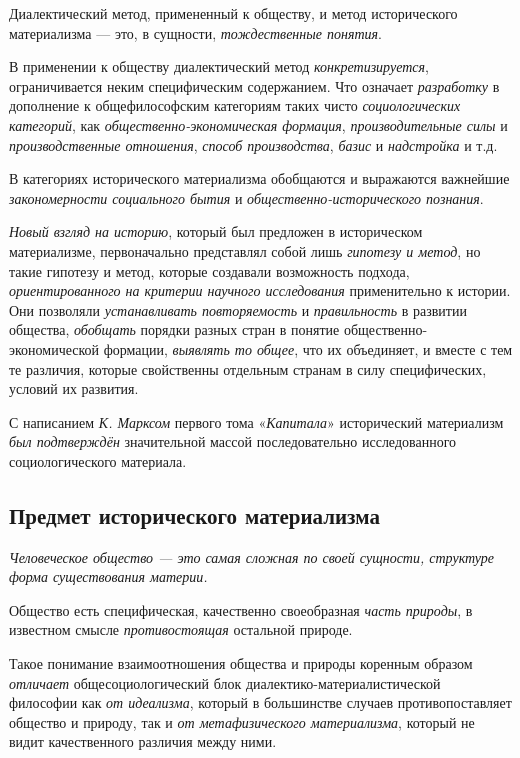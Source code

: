 \documentclass[a4paper,14pt,russian]{extreport}
\begin{document}
Диалектический метод, примененный к обществу, и метод исторического материализма --- это, в сущности, \emph{тождественные понятия}.

В применении к обществу диалектический метод \emph{конкретизируется}, ограничивается неким специфическим содержанием. Что означает \emph{разработку} в дополнение к общефилософским категориям таких чисто \emph{социологических категорий}, как \emph{общественно-экономическая формация}, \emph{производительные силы} и \emph{производственные отношения}, \emph{способ производства}, \emph{базис} и \emph{надстройка} и т.д.

В категориях исторического материализма обобщаются и выражаются важнейшие \emph{закономерности социального бытия} и \emph{общественно-исторического познания}.

\emph{Новый взгляд на историю}, который был предложен в историческом материализме, первоначально представлял собой лишь \emph{гипотезу и метод}, но такие гипотезу и метод, которые создавали возможность подхода, \emph{ориентированного на критерии научного исследования} применительно к истории. Они позволяли \emph{устанавливать повторяемость} и \emph{правильность} в развитии общества, \emph{обобщать} порядки разных стран в понятие общественно-экономической формации, \emph{выявлять то общее}, что их объединяет, и вместе с тем те различия, которые свойственны отдельным странам в силу специфических, условий их развития.

С написанием \emph{К. Марксом} первого тома «\emph{Капитала}» исторический материализм \emph{был подтверждён} значительной массой последовательно исследованного социологического материала.

\subsection{Предмет исторического материализма}

\emph{Человеческое общество --- это самая сложная по своей сущности, структуре форма существования материи.}

Общество есть специфическая, качественно своеобразная \emph{часть природы}, в известном смысле \emph{противостоящая} остальной природе.

Такое понимание взаимоотношения общества и природы коренным образом \emph{отличает} общесоциологический блок диалектико-материалистической философии как \emph{от идеализма}, который в большинстве случаев противопоставляет общество и природу, так и \emph{от метафизического материализма}, который не видит качественного различия между ними.
\end{document}
